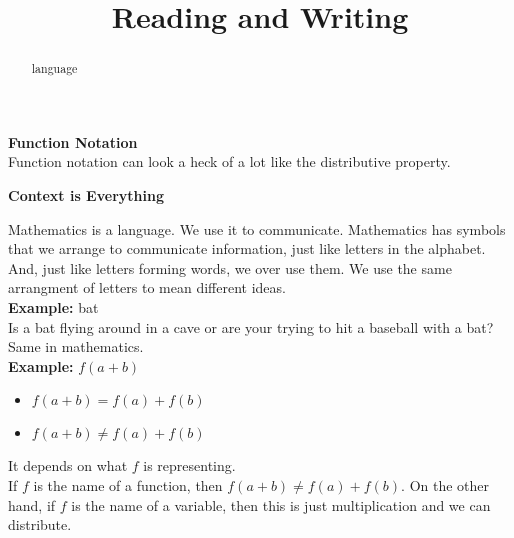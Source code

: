 \documentclass{ximera}
\title{Reading and Writing}
\begin{document}
\begin{abstract}
language
\end{abstract}
\maketitle





\begin{warning} \textbf{\textcolor{red!80!black}{Function Notation}}  \\


Function notation can look a heck of a lot like the distributive property. \\


\begin{center}

\textbf{\textcolor{purple!85!blue}{Context is Everything}}

\end{center}


Mathematics is a language.  We use it to communicate.  Mathematics has symbols that we arrange to communicate information, just like letters in the alphabet. \\

And, just like letters forming words, we over use them.  We use the same arrangment of letters to mean different ideas. \\

\textbf{Example:} bat \\

Is a bat flying around in a cave or are your trying to hit a baseball with a bat? \\


Same in mathematics.\\



\textbf{Example:} $f(a + b)$ \\

\begin{itemize}
	\item $f(a + b) = f(a) + f(b)$
	\item $f(a + b) \ne f(a) + f(b)$
\end{itemize}


It depends on what $f$ is representing. \\

If $f$ is the name of a function, then $f(a + b) \ne f(a) + f(b)$.  On the other hand, if $f$ is the name of a variable, then this is just multiplication and we can distribute.



\end{warning}
\end{document}
